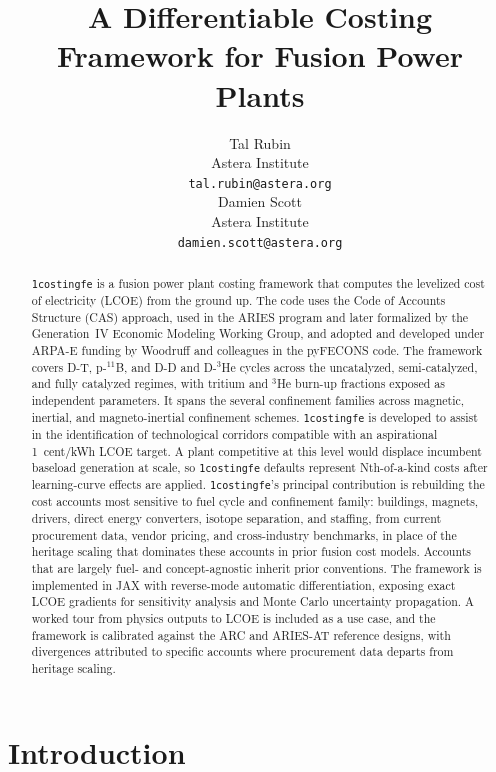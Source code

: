 \documentclass{article}
\title{A Differentiable Costing Framework for Fusion Power Plants}
\author{
	Tal Rubin \\
	Astera Institute \\
	\texttt{tal.rubin@astera.org} \\
	\And
	Damien Scott \\
	Astera Institute \\
	\texttt{damien.scott@astera.org} \\
}
\begin{document}
\maketitle

\begin{abstract}
\texttt{1costingfe} is a fusion power plant costing framework that
computes the levelized cost of electricity (LCOE) from the ground up.
The code uses the Code of Accounts Structure (CAS) approach, used in
the ARIES program and later formalized by the Generation~IV Economic
Modeling Working Group, and adopted and developed under ARPA-E funding
by Woodruff and colleagues in the pyFECONS code.
The framework covers D-T, p-${}^{11}$B, and D-D and D-${}^3$He
cycles across the uncatalyzed, semi-catalyzed, and fully catalyzed
regimes, with tritium and ${}^3$He burn-up fractions exposed as
independent parameters. It spans the several confinement families
across magnetic, inertial, and magneto-inertial confinement schemes.
\texttt{1costingfe} is developed to assist in the identification 
of technological corridors compatible with an aspirational 1~cent/kWh 
LCOE target. A plant competitive at this level would displace incumbent 
baseload generation at scale, so \texttt{1costingfe} defaults represent 
Nth-of-a-kind costs after learning-curve effects are applied.
\texttt{1costingfe}'s principal contribution is rebuilding the cost
accounts most sensitive to fuel cycle and confinement family:
buildings, magnets, drivers, direct energy converters, isotope
separation, and staffing, from current procurement data, vendor
pricing, and cross-industry benchmarks, in place of the heritage
scaling that dominates these accounts in prior fusion cost models.
Accounts that are largely fuel- and concept-agnostic inherit prior
conventions. The framework is implemented in JAX with reverse-mode
automatic differentiation, exposing exact LCOE gradients for
sensitivity analysis and Monte Carlo uncertainty propagation. A
worked tour from physics outputs to LCOE is included as a use case,
and the framework is calibrated against the ARC and ARIES-AT
reference designs, with divergences attributed to specific accounts
where procurement data departs from heritage scaling.
\end{abstract}



\section{Introduction}
\label{sec:intro}
\end{document}
